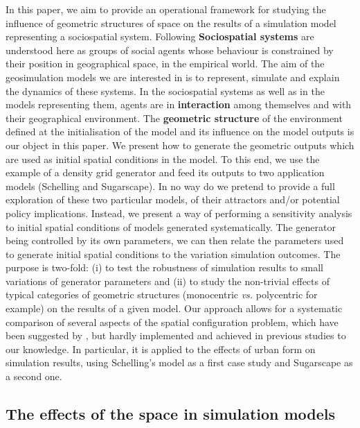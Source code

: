 \documentclass{JASSS}
\begin{document}
In this paper, we aim to provide an operational framework for studying the influence of geometric structures of space on the results of a simulation model representing a sociospatial system. Following \citep{Jessop2008} {\bf Sociospatial systems} are understood here as groups of social agents whose behaviour is constrained by their position in geographical space, in the empirical world. The aim of the geosimulation models we are interested in is to represent, simulate and explain the dynamics of these systems. In the sociospatial systems as well as in the models representing them, agents are in {\bf interaction} among themselves and with their geographical environment. The {\bf geometric structure} of the environment defined at the initialisation of the model and its influence on the model outputs is our object in this paper. We present how to generate the geometric outputs which are used as initial spatial conditions in the model. To this end, we use the example of a density grid generator and feed its outputs to two application models (Schelling and Sugarscape). In no way do we pretend to provide a full exploration of these two particular models, of their attractors and/or potential policy implications. Instead, we present a way of performing a sensitivity analysis to initial spatial conditions of models generated systematically. The generator being controlled by its own parameters, we can then relate the parameters used to generate initial spatial conditions to the variation simulation outcomes. The purpose is two-fold: (i) to test the robustness of simulation results to small variations of generator parameters and (ii) to study the non-trivial effects of typical categories of geometric structures (monocentric \textit{vs.} polycentric for example) on the results of a given model. Our approach allows for a systematic comparison of several aspects of the spatial configuration problem, which have been suggested by \citet{filatova2013spatial}, but hardly implemented and achieved in previous studies to our knowledge. In particular, it is applied to the effects of urban form on simulation results, using Schelling's model as a first case study and Sugarscape as a second one. 

\subsection{The effects of the space in simulation models}
\end{document}

